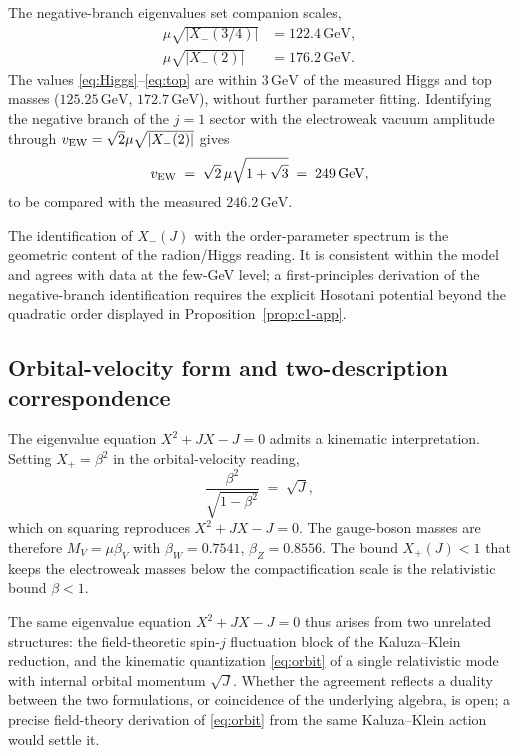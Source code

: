 \documentclass[aps,prd,onecolumn,superscriptaddress,nofootinbib,reprint]{revtex4-2}
\newcommand{\Xp}{X_{+}}
\newcommand{\Xm}{X_{-}}
\begin{document}
The negative-branch eigenvalues set companion scales,
\begin{align}
  \mu\sqrt{|\Xm(3/4)|} &= 122.4\,\text{GeV},
  \label{eq:Higgs}\\
  \mu\sqrt{|\Xm(2)|} &= 176.2\,\text{GeV}.
  \label{eq:top}
\end{align}
The values \eqref{eq:Higgs}--\eqref{eq:top} are within $3\,\text{GeV}$
of the measured Higgs and top masses ($125.25\,\text{GeV}$,
$172.7\,\text{GeV}$), without further parameter fitting.  Identifying
the negative branch of the $j=1$ sector with the electroweak vacuum
amplitude through $v_{\rm EW}=\sqrt 2\mu\sqrt{|\Xm(2)|}$ gives
\begin{equation}
  v_{\rm EW}\;=\;\sqrt 2\,\mu\sqrt{1+\sqrt 3}\;=\;249\,\text{GeV},
\label{eq:vEW-app}
\end{equation}
to be compared with the measured $246.2\,\text{GeV}$.

The identification of $\Xm(J)$ with the order-parameter spectrum is
the geometric content of the radion/Higgs reading.  It is consistent
within the model and agrees with data at the few-GeV level; a
first-principles derivation of the negative-branch identification
requires the explicit Hosotani potential beyond the quadratic order
displayed in Proposition~\ref{prop:c1-app}.

\subsection{Orbital-velocity form and two-description correspondence}

The eigenvalue equation $X^{2}+JX-J=0$ admits a kinematic
interpretation.  Setting $X_{+}=\beta^{2}$ in the orbital-velocity
reading,
\begin{equation}
  \frac{\beta^{2}}{\sqrt{1-\beta^{2}}}\;=\;\sqrt J,
\label{eq:orbit}
\end{equation}
which on squaring reproduces $X^{2}+JX-J=0$.  The gauge-boson masses
are therefore $M_{V}=\mu\beta_{V}$ with $\beta_{W}=0.7541$,
$\beta_{Z}=0.8556$.  The bound $\Xp(J)<1$ that keeps the electroweak
masses below the compactification scale is the relativistic bound
$\beta<1$.

The same eigenvalue equation $X^{2}+JX-J=0$ thus arises from two
unrelated structures: the field-theoretic spin-$j$ fluctuation block
of the Kaluza--Klein reduction, and the kinematic quantization
\eqref{eq:orbit} of a single relativistic mode with internal orbital
momentum $\sqrt{J}$.  Whether the agreement reflects a duality
between the two formulations, or coincidence of the underlying
algebra, is open; a precise field-theory derivation of \eqref{eq:orbit}
from the same Kaluza--Klein action would settle it.
\end{document}
